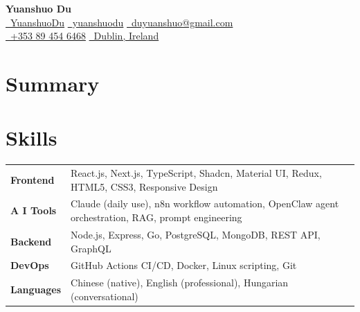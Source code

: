 \documentclass{simpleresume}
\begin{document}
\begin{center}
  {\Large\sffamily\bfseries\color{namecolor} Yuanshuo Du}\\[0.12cm]
  {\sffamily\small
    \href{https://github.com/YuanshuoDu}{\color{accent}\faGithub\color{muted}\ YuanshuoDu}
    \quad\textbullet\quad
    \href{https://linkedin.com/in/yuanshuodu}{\color{accent}\faLinkedin\color{muted}\ yuanshuodu}
    \quad\textbullet\quad
    \href{https://mail.google.com/mail/?view=cm&to=duyuanshuo@gmail.com}{\color{accent}\faEnvelope\color{muted}\ duyuanshuo@gmail.com}
  }\\[0.06cm]
  {\sffamily\small\color{muted}
    \href{tel:+353894546468}{\color{accent}\faPhone\color{muted}\ +353 89 454 6468}
    \quad\textemdash\quad
    \href{https://www.google.com/maps/place/Dublin,+Ireland}{\color{accent}\faMapMarker\ Dublin, Ireland}
  }
\end{center}
\headerrule

\section{Summary}
\vspace{-0.05cm}
\vspace{-0.08cm}

\section{Skills}
\noindent
\begin{tabular}{p{2.4cm}p{14.0cm}}
\textbf{Frontend} & React.js, Next.js, TypeScript, Shadcn, Material UI, Redux, HTML5, CSS3, Responsive Design \\[-3pt]
\textbf{A I Tools} & Claude (daily use), n8n workflow automation, OpenClaw agent orchestration, RAG, prompt engineering \\[-3pt]
\textbf{Backend} & Node.js, Express, Go, PostgreSQL, MongoDB, REST API, GraphQL \\[-3pt]
\textbf{DevOps} & GitHub Actions CI/CD, Docker, Linux scripting, Git \\[-3pt]
\textbf{Languages} & Chinese (native), English (professional), Hungarian (conversational) \\
\end{tabular}
\vspace{0.05cm}
\end{document}
